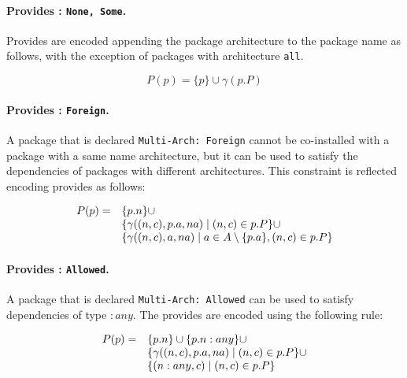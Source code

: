 \paragraph{Provides : \texttt{None, Some}.}

Provides are encoded appending the package architecture
to the package name as follows, with the exception of packages with
architecture \texttt{all}.

\[
  P(p) = \{ p \} \cup \gamma(p.P)
\]

\paragraph{Provides : \texttt{Foreign}.}

A package that is declared \texttt{Multi-Arch: Foreign} cannot be
co-installed with a package with a same name
architecture, but it can be used to satisfy the dependencies of
packages with different architectures. This constraint is reflected 
encoding provides as follows:

\[
  \begin{array}{rl}
    P(p) = & \{ p.n \} \cup \\
    & \{ \gamma((n,c), p.a,na) \mid (n,c) \in p.P \} \cup \\
    & \{ \gamma((n,c),a,na) \mid a \in A \setminus \{ p.a \}, (n,c) \in p.P \}
   \end{array}
\]


\paragraph{Provides : \texttt{Allowed}.}
A package that is declared \texttt{Multi-Arch: Allowed} can be used to 
satisfy dependencies of type $:any$. The provides are encoded using
the following rule:

\[
  \begin{array}{rl}
    P(p) = & \{ p.n \} \cup \{ p.n:any \} \cup \\
    & \{ \gamma((n,c), p.a,na) \mid (n,c) \in p.P \} \cup \\
    & \{ (n:any,c) \mid (n,c) \in p.P \} 
   \end{array}
\]
